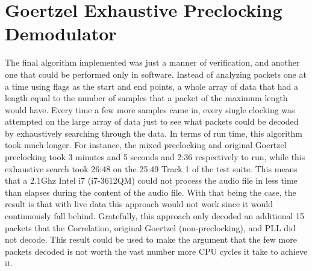 \section{Goertzel Exhaustive Preclocking Demodulator}
The final algorithm implemented was just a manner of verification, and another one that could be performed only in software. Instead of analyzing packets one at a time using flags as the start and end points, a whole array of data that had a length equal to the number of samples that a packet of the maximum length would have. Every time a few more samples came in, every single clocking was attempted on the large array of data just to see what packets could be decoded by exhaustively searching through the data. In terms of run time, this algorithm took much longer. For instance, the mixed preclocking and original Goertzel preclocking took 3 minutes and 5 seconds and 2:36 respectively to run, while this exhaustive search took 26:48 on the 25:49 Track 1 of the test suite. This means that a 2.1Ghz Intel i7 (i7-3612QM) could not process the audio file in less time than elapses during the content of the audio file. With that being the case, the result is that with live data this approach would not work since it would continuously fall behind. Gratefully, this approach only decoded an additional 15 packets that the Correlation, original Goertzel (non-preclocking), and PLL did not decode. This result could be used to make the argument that the few more packets decoded is not worth the vast number more CPU cycles it take to achieve it.

